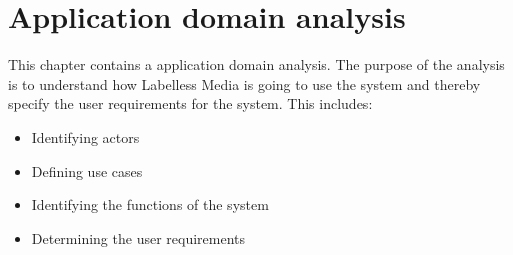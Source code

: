
\chapter{Application domain analysis}
This chapter contains a application domain analysis. The purpose of the analysis is to understand how Labelless Media is going to use the system and thereby specify the user requirements for the system. This includes: 
\begin{itemize}
  \item Identifying actors
  \item Defining use cases
  \item Identifying the functions of the system
  \item Determining the user requirements
\end{itemize}

